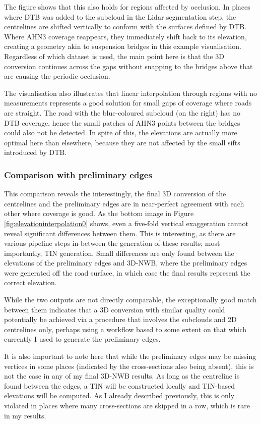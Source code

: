 The figure shows that this also holds for regions affected by occlusion. In places where DTB was added to the subcloud in the Lidar segmentation step, the centrelines are shifted vertically to conform with the surfaces defined by DTB. Where AHN3 coverage reappears, they immediately shift back to its elevation, creating a geometry akin to suspension bridges in this example visualisation. Regardless of which dataset is used, the main point here is that the 3D conversion continues across the gaps without snapping to the bridges above that are causing the periodic occlusion.

The visualisation also illustrates that linear interpolation through regions with no measurements represents a good solution for small gaps of coverage where roads are straight. The road with the blue-coloured subcloud (on the right) has no DTB coverage, hence the small patches of AHN3 points between the bridges could also not be detected. In spite of this, the elevations are actually more optimal here than elsewhere, because they are not affected by the small sifts introduced by DTB.

\subsubsection{Comparison with preliminary edges}

This comparison reveals the interestingly, the final 3D conversion of the centrelines and the preliminary edges are in near-perfect agreement with each other where coverage is good. As the bottom image in Figure \ref{fig:elevationinterpolation0} shows, even a five-fold vertical exaggeration cannot reveal significant differences between them. This is interesting, as there are various pipeline steps in-between the generation of these results; most importantly, TIN generation. Small differences are only found between the elevations of the preliminary edges and 3D-NWB, where the preliminary edges were generated off the road surface, in which case the final results represent the correct elevation.

While the two outputs are not directly comparable, the exceptionally good match between them indicates that a 3D conversion with similar quality could potentially be achieved via a procedure that involves the subclouds and 2D centrelines only, perhaps using a workflow based to some extent on that which currently I used to generate the preliminary edges.

It is also important to note here that while the preliminary edges may be missing vertices in some places (indicated by the cross-sections also being absent), this is not the case in any of my final 3D-NWB results. As long as the centreline is found between the edges, a TIN will be constructed locally and TIN-based elevations will be computed. As I already described previously, this is only violated in places where many cross-sections are skipped in a row, which is rare in my results.

